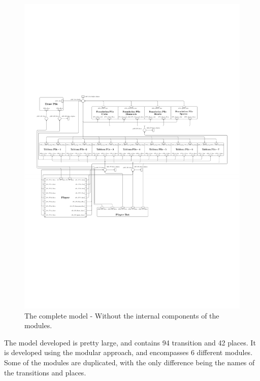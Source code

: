 \documentclass[runningheads,a4paper]{llncs}
\begin{document}
\begin{figure}
	\begin{center} %
		\includegraphics[trim=250 260 230 330,scale=1.1]{images/overallViewPdf}
		\caption{The complete model - Without the internal components of the modules.}
		\label{fig:full_horizontal}
	\end{center}
\end{figure}


The model developed is pretty large, and contains 94 transition and 42 places. It is developed using the modular approach, and encompasses 6 different modules. Some of the modules are duplicated, with the only difference being the names of the transitions and places.
\newline
\end{document}
